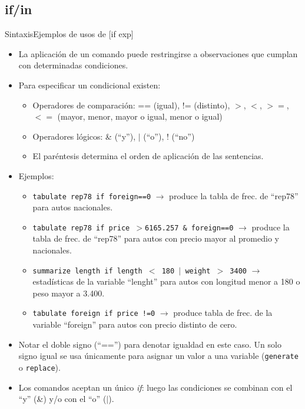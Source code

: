 \documentclass{beamer}
\begin{document}
\subsection{if/in}
\begin{frame}[allowframebreaks]{Sintaxis}{Ejemplos de usos de [if exp]}
\begin{itemize}
\item La aplicación de un comando puede restringirse a observaciones que cumplan con determinadas condiciones. 
\item Para especificar un condicional existen: 
\begin{itemize}
\item Operadores de comparación: == (igual), != (distinto), $>$, $<$, $>=$, $<=$ (mayor, menor, mayor o igual, menor o igual)
\item Operadores lógicos: \& (``y''), $|$ (``o''), ! (``no'')
\item El paréntesis determina el orden de aplicación de las sentencias.
\end{itemize}
\item Ejemplos:
\begin{itemize} 
\item \texttt{tabulate rep78 if foreign==0}  \hspace{0.3 cm} $\rightarrow$ produce la tabla de frec. de ``rep78'' para autos nacionales.
\item \texttt{tabulate rep78 if price $>$6165.257 \& foreign==0}  \hspace{0.3 cm} $\rightarrow$ produce la tabla de frec. de ``rep78'' para autos con precio mayor al promedio y nacionales.
\item  \texttt{summarize length if length $<$ 180 $|$ weight $>$ 3400}  \hspace{0.3 cm} $\rightarrow$ estadísticas de la variable ``lenght'' para autos con longitud menor a 180 o peso mayor a 3.400.
\item  \texttt{tabulate foreign if price !=0}  \hspace{0.3 cm} $\rightarrow$ produce tabla de frec. de la variable ``foreign'' para autos con precio distinto de cero.
\end{itemize}
\item Notar el doble signo (``=='') para denotar igualdad en este caso. Un solo signo igual se usa únicamente para asignar un valor a una variable (\texttt{generate} o \texttt{replace}).
\item Los comandos aceptan un único \textit{if}: luego las condiciones se combinan con el ``y'' (\&) y/o con el ``o'' ($|$).
\end{itemize}
\end{frame}
\end{document}
